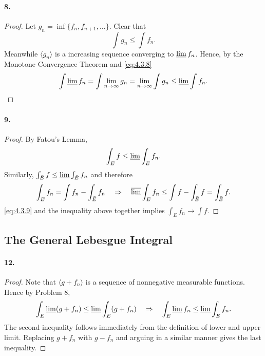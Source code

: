   \paragraph{8.}
  \begin{proof}
    Let $g_n = \inf\{f_n,f_{n+1},\dots\}$. Clear that 
    \begin{equation}
      \label{eq:4.3.8}
      \int g_n \le \int f_n.
    \end{equation}
    Meanwhile $\langle g_n\rangle$ is a increasing sequence converging to 
    $\operatorname*{\underline{lim}} f_n$. Hence, by the Monotone Convergence Theorem and 
    \eqref{eq:4.3.8}
    \[
      \int \operatorname*{\underline{lim}} f_n = \int \lim_{n\to\infty}g_n = 
      \lim_{n\to\infty}\int g_n \le \operatorname*{\underline{lim}}\int f_n.
    \]
  \end{proof}

  \paragraph{9.}
  \begin{proof}
    By Fatou's Lemma,
    \begin{equation}
      \label{eq:4.3.9}
      \int_E f \le \operatorname*{\underline{lim}}\int_E f_n.
    \end{equation}
    Similarly, $\int_{\bar{E}}f \le \operatorname*{\underline{lim}}\int_{\bar{E}} f_n$ and therefore
    \[
      \int_E f_n = \int f_n-\int_{\bar{E}} f_n\quad\Rightarrow\quad
      \operatorname*{\overline{lim}}\int_E f_n \le \int f- \int_{\bar{E}} f = \int_{\bar{E}} f.
    \]
    \eqref{eq:4.3.9} and the inequality above together implies $\int_E f_n\to
    \int f$.
  \end{proof}

\subsection{The General Lebesgue Integral}
  \paragraph{12.}
  \begin{proof}
    Note that $\langle g+f_n\rangle$ is a sequence of nonnegative measurable
    functions. Hence by Problem 8,
    \[
      \int_E\operatorname*{\underline{lim}}(g+f_n) \le \operatorname*{\underline{lim}}\int_E(g+f_n) \quad\Rightarrow\quad
      \int_E\operatorname*{\underline{lim}} f_n \le \operatorname*{\underline{lim}}\int_E f_n.
    \]
    The second inequality follows immediately from the definition of lower and
    upper limit. Replacing $g+f_n$ with $g-f_n$ and arguing in a similar manner
    gives the last inequality.
  \end{proof}

